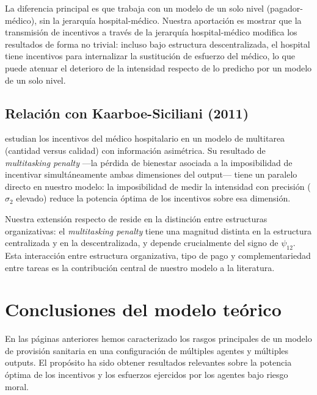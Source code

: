 \documentclass[12pt, a4paper, twoside, openright]{book}
\theoremstyle{plain}
\theoremstyle{definition}
\theoremstyle{remark}
\begin{document}
La diferencia principal es que \citet{eggleston2005} trabaja con un modelo de un solo nivel (pagador-médico), sin la jerarquía hospital-médico. Nuestra aportación es mostrar que la transmisión de incentivos a través de la jerarquía hospital-médico modifica los resultados de forma no trivial: incluso bajo estructura descentralizada, el hospital tiene incentivos para internalizar la sustitución de esfuerzo del médico, lo que puede atenuar el deterioro de la intensidad respecto de lo predicho por un modelo de un solo nivel.

\subsection{Relación con Kaarboe-Siciliani (2011)}

\citet{kaarboe2011} estudian los incentivos del médico hospitalario en un modelo de multitarea (cantidad versus calidad) con información asimétrica. Su resultado de \textit{multitasking penalty} ---la pérdida de bienestar asociada a la imposibilidad de incentivar simultáneamente ambas dimensiones del output--- tiene un paralelo directo en nuestro modelo: la imposibilidad de medir la intensidad con precisión ($\sigma_2$ elevado) reduce la potencia óptima de los incentivos sobre esa dimensión.

Nuestra extensión respecto de \citet{kaarboe2011} reside en la distinción entre estructuras organizativas: el \textit{multitasking penalty} tiene una magnitud distinta en la estructura centralizada y en la descentralizada, y depende crucialmente del signo de $\psi_{12}$. Esta interacción entre estructura organizativa, tipo de pago y complementariedad entre tareas es la contribución central de nuestro modelo a la literatura.

\section{Conclusiones del modelo teórico}
\label{sec:conclusiones_modelo}

En las páginas anteriores hemos caracterizado los rasgos principales de un modelo de provisión sanitaria en una configuración de múltiples agentes y múltiples outputs. El propósito ha sido obtener resultados relevantes sobre la potencia óptima de los incentivos y los esfuerzos ejercidos por los agentes bajo riesgo moral.
\end{document}
